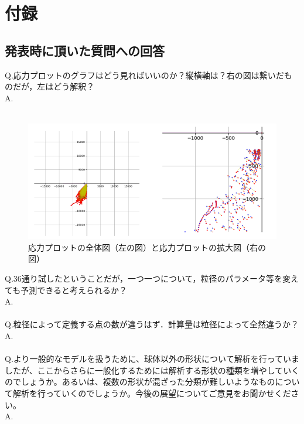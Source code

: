 \documentclass[12pt]{ltjsarticle}
\begin{document}
\newpage
{}
\section*{付録}
\subsection*{発表時に頂いた質問への回答}
Q.応力プロットのグラフはどう見ればいいのか？縦横軸は？右の図は繋いだものだが，左はどう解釈？\\
A.\\\\
\begin{figure}[htbp]
  \centering
  \includegraphics*[keepaspectratio, scale=0.3]{syuron_stress_plot.PNG}
  \caption{応力プロットの全体図（左の図）と応力プロットの拡大図（右の図）}
\end{figure}


Q.36通り試したということだが，一つ一つについて，粒径のパラメータ等を変えても予測できると考えられるか？\\
A.\\\\
Q.粒径によって定義する点の数が違うはず．計算量は粒径によって全然違うか？\\
A.\\\\
Q.より一般的なモデルを扱うために、球体以外の形状について解析を行っていましたが、ここからさらに一般化するためには解析する形状の種類を増やしていくのでしょうか。あるいは、複数の形状が混ざった分類が難しいようなものについて解析を行っていくのでしょうか。今後の展望についてご意見をお聞かせください。\\
A.\\
\end{document}
